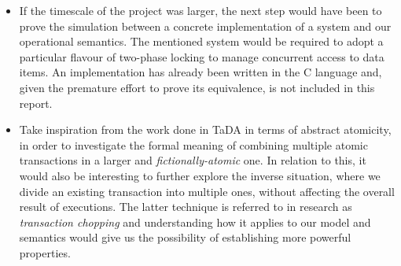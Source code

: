\begin{itemize}
	\item If the timescale of the project was larger, the next step would have been to prove the simulation between a concrete implementation of a system and our operational semantics. The mentioned system would be required to adopt a particular flavour of two-phase locking to manage concurrent access to data items. An implementation has already been written in the C language and, given the premature effort to prove its equivalence, is not included in this report.
	
	\item Take inspiration from the work done in TaDA \cite{tada} in terms of abstract atomicity, in order to investigate the formal meaning of combining multiple atomic transactions in a larger and \textit{fictionally-atomic} one. In relation to this, it would also be interesting to further explore the inverse situation, where we divide an existing transaction into multiple ones, without affecting the overall result of executions. The latter technique is referred to in research as \textit{transaction chopping} and understanding how it applies to our model and semantics would give us the possibility of establishing more powerful properties.
\end{itemize}